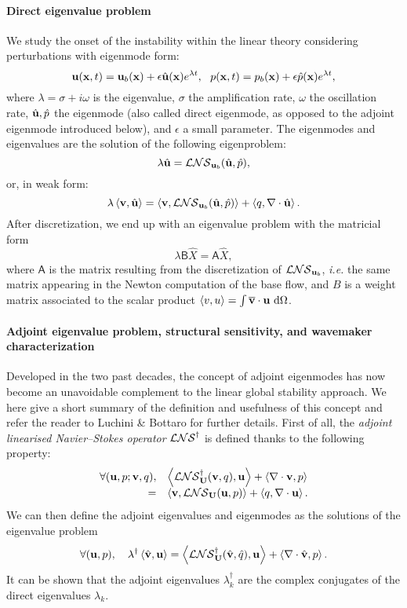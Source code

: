 \documentclass[twocolumn,10pt]{asme2ej}
\newcommand{\be}[1]{ \begin{equation} \label{#1}}
\newcommand{\ee}{\end{equation}}
\newcommand{\bes}[1]{ \begin{equation} \label{#1}\begin{array}{rl}}
\newcommand{\ees}{\end{array}\end{equation}}
\begin{document}
\paragraph{Direct eigenvalue problem}
We study the onset of the instability within the linear theory considering perturbations with eigenmode form:
\be{startmodepropre}
{\bf u} ({\bf{x}},t) = {\bf u}_b({\bf{x}}) + \epsilon \hat{\bf u}({\bf{x}}) e^{\lambda t}, \,\,\,\, {p}({\bf{x}},t) = {p}_b({\bf{x}}) + \epsilon \hat{p}({\bf{x}}) e^{\lambda t},
\ee
where $\lambda = \sigma + i \omega$ is the eigenvalue, $\sigma$ the amplification rate,
$\omega$ the oscillation rate, $\hat{{\bf u}},\hat{p}$ the eigenmode (also called direct eigenmode, as opposed to the adjoint eigenmode introduced below), 
and $\epsilon$ a small parameter. The eigenmodes and eigenvalues are the solution of the following eigenproblem:
 \be{LEP}
\lambda \hat{{\bf u}} = {\cal LNS}_{{\bf u}_b}( \hat{\bf u},\hat{p}),
\ee
or, in weak form: 
\be{eigenvalueproblem}
\lambda \left< {\bf v} , \hat{{\bf u}} \right> = \left< {\bf v}, {\cal LNS}_{{\bf u}_b} ( \hat{\bf u},\hat{p})\right> + \left< q, \nabla \cdot \hat{\bf u} \right>.
\ee
After discretization, we end up with an eigenvalue problem with the matricial form
\be{Eigen_matricial}
\lambda {\mathsf{B}} \hat{X} = {\mathsf{A}} \hat{X},
\ee
where ${\mathsf{A}}$ is the matrix resulting from the discretization of ${\cal LNS}_{{\bf u}_b}$, \textit{i.e.} the same matrix  appearing in the Newton computation of the base flow, and  $B$ is a weight matrix associated to the scalar product $\left<v,u\right> = \int \overline{\bf v} \cdot {\bf u} \mbox{ d} \Omega$.

\paragraph{Adjoint eigenvalue problem, structural sensitivity, and wavemaker characterization}
Developed in the two past decades, the concept of adjoint eigenmodes has now become an unavoidable complement to the linear global stability approach. We here give a short summary of the definition and usefulness of this concept and refer the reader to Luchini \& Bottaro\cite{LucBott2014} for further details.
First of all, the {\em adjoint linearised Navier--Stokes operator} ${\cal LNS}^\dag$ is defined thanks to the following 
property:
\bes{NSLAdj}
\forall ( {\bf u}, p ; {\bf v}, q), & \left< {\cal LNS}^\dag_{\bf U}( {\bf v},q) ,{\bf u}\right> + \left< \nabla \cdot {\bf v},p\right>  \\
=& \left< {\bf v}, {\cal LNS}_{\bf U} ({\bf u},p)\right> + \left< q, \nabla \cdot {\bf u}\right>.
\ees
We can then define the adjoint eigenvalues and eigenmodes as the solutions of the eigenvalue problem 
\be{EigenAdj} 
\forall ( {\bf u}, p), \quad  \lambda^\dag \left< \hat{\bf v}, {\bf u}\right> =
 \left< {\cal LNS}^\dag_{\bf U}( \hat{\bf v},\hat{q}) ,{\bf u}\right> + \left< \nabla \cdot \hat{\bf v},p\right> . 
\ee
It can be shown \cite{SchmidHenningson2001} that the adjoint eigenvalues $\lambda^\dag_k$ are the complex conjugates of the direct eigenvalues $\lambda_k$. 
\end{document}
